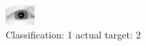 \begin{figure}[h!]
\begin{center}
\includegraphics[width=0.60\columnwidth]{figures/ID3067_class_1_target_2.png}
\end{center}
\caption{ Classification: 1 actual target: 2}
\label{fig:ID3067_class_1_target_2}
\end{figure}
